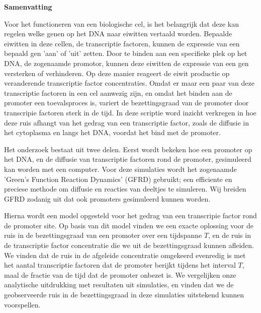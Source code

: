 \begin{center}
{\center \bf Samenvatting}
\end{center}

Voor het functioneren van een biologische cel, is het belangrijk dat deze kan regelen welke genen op het DNA naar eiwitten vertaald worden. Bepaalde eiwitten in deze cellen, de transcriptie factoren, kunnen de expressie van een bepaald gen 'aan' of 'uit' zetten. Door te binden aan een specifieke plek op het DNA, de zogenaamde promotor, kunnen deze eiwitten de expressie van een gen versterken of verhinderen. Op deze manier reageert de eiwit productie op veranderende transcriptie factor concentraties. Omdat er maar een paar van deze transcriptie factoren in een cel aanwezig zijn, en omdat het binden aan de promoter een toevalsproces is, variert de bezettingsgraad van de promoter door transcripie factoren sterk in de tijd. In deze scriptie word inzicht verkregen in hoe deze ruis afhangt van het gedrag van een transcriptie factor, zoals de diffusie in het cytoplasma en langs het DNA, voordat het bind met de promoter. 

Het onderzoek bestaat uit twee delen. Eerst wordt bekeken hoe een promoter op het DNA, en de diffusie van transcriptie factoren rond de promoter, gesimuleerd kan worden met een computer. Voor deze simulaties wordt het zogenaamde 'Green's Function Reaction Dynamics' (GFRD) gebruikt; een efficiente en preciese methode om diffusie en reacties van deeltjes te simuleren. Wij breiden GFRD zodanig uit dat ook promoters gesimuleerd kunnen worden.

Hierna wordt een model opgesteld voor het gedrag van een transcripie factor rond de promoter site. Op basis van dit model vinden we een exacte oplossing voor de ruis in de bezettingsgraad van een promoter over een tijdspanne $T$, en de ruis in de transcriptie factor concentratie die we uit de bezettingsgraad kunnen afleiden. We vinden dat de ruis in de afgeleide concentratie omgekeerd evenredig is met het aantal transcriptie factoren dat de promoter berijkt tijdens het interval $T$, maal de fractie van de tijd dat de promoter onbezet is. We vergelijken onze analytische uitdrukking met resultaten uit simulaties, en vinden dat we de geobserveerde ruis in de bezettingsgraad in deze simulaties uitstekend kunnen voorspellen.